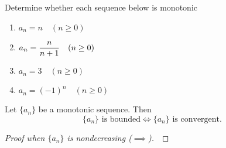 \begin{example}
Determine whether each sequence below is monotonic
\begin{enumerate}
\item $a_n=n\quad (n\ge 0)$
\vfill
\item $\displaystyle a_n=\frac{n}{n+1}\quad (n\ge 0)$
\vfill
\item $a_n=3\quad (n\ge 0)$
\vfill
\item $a_n=(-1)^n\quad (n\ge 0)$
\vfill
\end{enumerate}
\end{example}

\newpage

\begin{theorem}
Let $\{a_n\}$ be a monotonic sequence.  
Then
\begin{equation*}
\{a_n\} \text{ is bounded} \iff \{a_n\} \text{ is convergent}.
\end{equation*}
\end{theorem}
\begin{proof}[Proof when $\{a_n\}$ is nondecreasing ($\implies$)]\,

\vspace{7in}
\end{proof}
